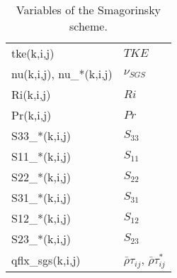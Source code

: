 \begin{table}[htbp]
  \caption{Variables of the Smagorinsky scheme.}
  \label{table:vars_smg}
  \begin{tabular}{ll}\hline
    tke(k,i,j) & $TKE$ \\
    nu(k,i,j), nu\_*(k,i,j) & $\nu_{SGS}$ \\
    Ri(k,i,j) & $Ri$ \\
    Pr(k,i,j) & $Pr$ \\
    S33\_*(k,i,j) & $S_{33}$ \\
    S11\_*(k,i,j) & $S_{11}$ \\
    S22\_*(k,i,j) & $S_{22}$ \\
    S31\_*(k,i,j) & $S_{31}$ \\
    S12\_*(k,i,j) & $S_{12}$ \\
    S23\_*(k,i,j) & $S_{23}$ \\
    qflx\_sgs(k,i,j) & $\bar{\rho}\tau_{ij}$, $\bar{\rho}\tau^*_{ij}$ \\
  \hline\end{tabular}
\end{table}
